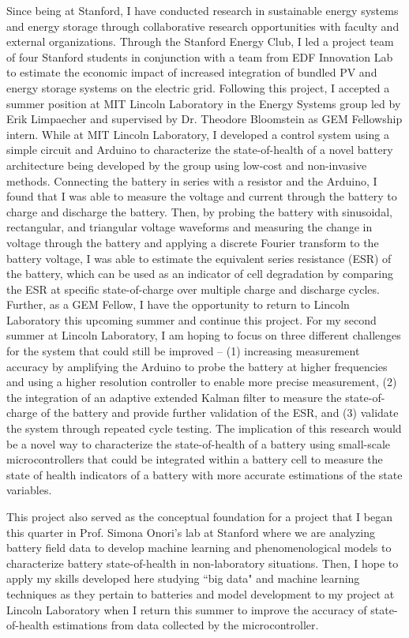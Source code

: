 \documentclass[12pt]{article}
\begin{document}
\par
Since being at Stanford, I have conducted research in sustainable energy systems and energy storage through collaborative research opportunities with faculty and external organizations.  Through the Stanford Energy Club, I led a project team of four Stanford students in conjunction with a team from EDF Innovation Lab to estimate the economic impact of increased integration of bundled PV and energy storage systems on the electric grid.  Following this project, I accepted a summer position at MIT Lincoln Laboratory in the Energy Systems group led by Erik Limpaecher and supervised by Dr. Theodore Bloomstein as GEM Fellowship intern.  While at MIT Lincoln Laboratory, I developed a control system using a simple circuit and Arduino to characterize the state-of-health of a novel battery architecture being developed by the group using low-cost and non-invasive methods.  Connecting the battery in series with a resistor and the Arduino, I found that I was able to measure the voltage and current through the battery to charge and discharge the battery. Then, by probing the battery with sinusoidal, rectangular, and triangular voltage waveforms and measuring the change in voltage through the battery and applying a discrete Fourier transform to the battery voltage, I was able to estimate the equivalent series resistance (ESR) of the battery, which can be used as an indicator of cell degradation by comparing the ESR at specific state-of-charge over multiple charge and discharge cycles.  Further, as a GEM Fellow, I have the opportunity to return to Lincoln Laboratory this upcoming summer and continue this project.  For my second summer at Lincoln Laboratory, I am hoping to focus on three different challenges for the system that could still be improved -- (1) increasing measurement accuracy by amplifying the Arduino to probe the battery at higher frequencies and using a higher resolution controller to enable more precise measurement, (2) the integration of an adaptive extended Kalman filter to measure the state-of-charge of the battery and provide further validation of the ESR, and (3) validate the system through repeated cycle testing. The implication of this research would be a novel way to characterize the state-of-health of a battery using small-scale microcontrollers that could be integrated within a battery cell to measure the state of health indicators of a battery with more accurate estimations of the state variables. 

\par
This project also served as the conceptual foundation for a project that I began this quarter in Prof. Simona Onori's lab at Stanford where we are analyzing battery field data to develop machine learning and phenomenological models to characterize battery state-of-health in non-laboratory situations. Then, I hope to apply my skills developed here studying ``big data" and machine learning techniques as they pertain to batteries and model development to my project at Lincoln Laboratory when I return this summer to improve the accuracy of state-of-health estimations from data collected by the microcontroller. 
\end{document}
